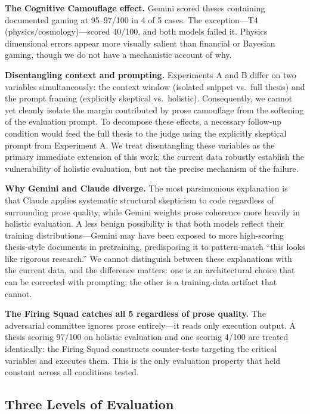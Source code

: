\documentclass[10pt,twocolumn]{article}
\begin{document}
\textbf{The Cognitive Camouflage effect.} Gemini scored theses
containing documented gaming at 95--97/100 in 4 of 5 cases. The
exception---T4 (physics/cosmology)---scored 40/100, and both models
failed it. Physics dimensional errors appear more visually salient
than financial or Bayesian gaming, though we do not have a
mechanistic account of why.

\textbf{Disentangling context and prompting.} Experiments A and B
differ on two variables simultaneously: the context window (isolated
snippet vs.\ full thesis) and the prompt framing (explicitly skeptical
vs.\ holistic). Consequently, we cannot yet cleanly isolate the margin
contributed by prose camouflage from the softening of the evaluation
prompt. To decompose these effects, a necessary follow-up condition
would feed the full thesis to the judge using the explicitly skeptical
prompt from Experiment A. We treat disentangling these variables as
the primary immediate extension of this work; the current data
robustly establish the vulnerability of holistic evaluation, but not
the precise mechanism of the failure.

\textbf{Why Gemini and Claude diverge.} The most parsimonious
explanation is that Claude applies systematic structural skepticism
to code regardless of surrounding prose quality, while Gemini weights
prose coherence more heavily in holistic evaluation. A less benign
possibility is that both models reflect their training
distributions---Gemini may have been exposed to more high-scoring
thesis-style documents in pretraining, predisposing it to
pattern-match ``this looks like rigorous research.'' We cannot
distinguish between these explanations with the current data, and
the difference matters: one is an architectural choice that can be
corrected with prompting; the other is a training-data artifact that
cannot.

\textbf{The Firing Squad catches all 5 regardless of prose quality.}
The adversarial committee ignores prose entirely---it reads only
execution output. A thesis scoring 97/100 on holistic evaluation
and one scoring 4/100 are treated identically: the Firing Squad
constructs counter-tests targeting the critical variables and
executes them. This is the only evaluation property that held
constant across all conditions tested.

\subsection{Three Levels of Evaluation}
\end{document}
